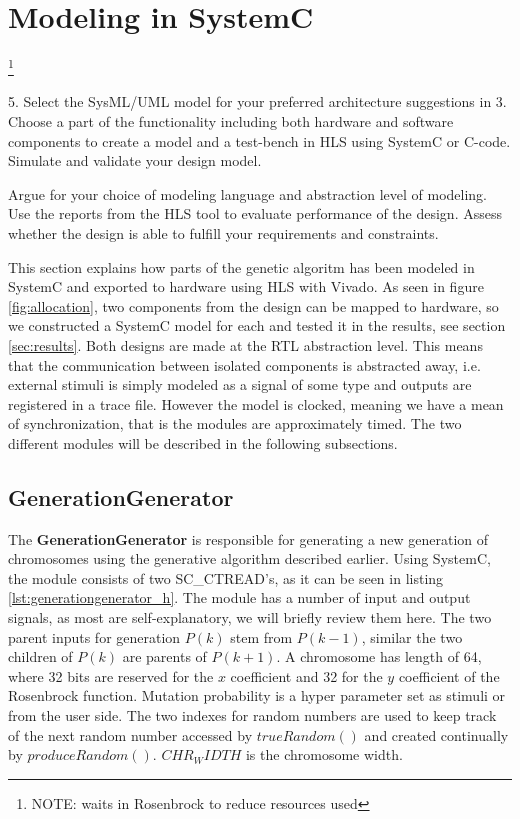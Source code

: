 \section{Modeling in SystemC}
\footnote{\color{red}NOTE: waits in Rosenbrock to reduce resources used}

\begin{framed}
5. Select the SysML/UML model for your preferred architecture suggestions in 3. Choose a part of the functionality including both hardware and software components to create a model and a test-bench in HLS using SystemC or C-code. Simulate and validate your design model.

Argue for your choice of modeling language and abstraction level of modeling. Use the reports from the HLS tool to evaluate performance of the design. Assess whether the design is able to fulfill your requirements and constraints.
\end{framed}

This section explains how parts of the genetic algoritm has been modeled in SystemC and exported to hardware using HLS with Vivado. As seen in figure \ref{fig:allocation}, two components from the design can be mapped to hardware, so we constructed a SystemC model for each and tested it in the results, see section \ref{sec:results}. Both designs are made at the RTL abstraction level. This means that the communication between isolated components is abstracted away, i.e. external stimuli is simply modeled as a signal of some type and outputs are registered in a trace file. However the model is clocked, meaning we have a mean of synchronization, that is the modules are approximately timed. The two different modules will be described in the following subsections.

\subsection{GenerationGenerator}
The \textbf{GenerationGenerator} is responsible for generating a new generation of chromosomes using the generative algorithm described earlier. Using SystemC, the module consists of two SC\_CTREAD's, as it can be seen in listing \ref{lst:generationgenerator_h}. The module has a number of input and output signals, as most are self-explanatory, we will briefly review them here. The two parent inputs for generation $P(k)$ stem from $P(k-1)$, similar the two children of $P(k)$ are parents of $P(k+1)$. A chromosome has length of 64, where 32 bits are reserved for the $x$ coefficient and 32 for the $y$ coefficient of the Rosenbrock function. Mutation probability is a hyper parameter set as stimuli or from the user side. The two indexes for random numbers are used to keep track of the next random number accessed by $trueRandom()$ and created continually by $produceRandom()$.  $CHR_WIDTH$ is the chromosome width.

